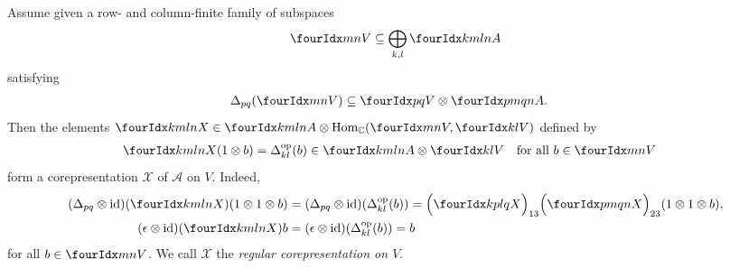 \begin{Exa} \label{example:corep-regular}
  Assume  given a row- and column-finite family of subspaces
  \begin{align*}
    \Gru{V}{m}{n} \subseteq \bigoplus_{k,l} \Gr{A}{k}{l}{m}{n}
  \end{align*}
  satisfying
  \begin{align} \label{eq:corep-regular-inclusion}
    \Delta_{pq}(\Gru{V}{m}{n}) &\subseteq \Gru{V}{p}{q} \otimes
    \Gr{A}{p}{q}{m}{n}.
  \end{align}
Then the  elements $\Gr{X}{k}{l}{m}{n} \in \Gr{A}{k}{l}{m}{n} \otimes
  \Hom_{\C}(\Gru{V}{m}{n},\Gru{V}{k}{l})$ defined by 
  \begin{align*}
    \Gr{X}{k}{l}{m}{n}(1 \otimes b) &= \Delta^{\op}_{kl}(b) \in
    \Gr{A}{k}{l}{m}{n} \otimes \Gru{V}{k}{l} \quad
    \text{for all } b\in \Gru{V}{m}{n}
  \end{align*}
  form a corepresentation $\mathscr{X}$ of $\mathscr{A}$ on
  $V$. Indeed, 
  \begin{align*}
    (\Delta_{pq} \otimes \id)(\Gr{X}{k}{l}{m}{n})(1 \otimes 1 \otimes
    b) &=(\Delta_{pq}\otimes \id)(\Delta^{\op}_{kl}(b)) =
    \Big{(}\Gr{X}{k}{l}{p}{q}\Big{)}_{13}\Big{(}\Gr{X}{p}{q}{m}{n}\Big{)}_{23}(1
    \otimes 1 \otimes b), \\
    (\epsilon \otimes \id)(\Gr{X}{k}{l}{m}{n})b &= (\epsilon \otimes
    \id)(\Delta^{\op}_{kl}(b)) = b
  \end{align*}
  for all $b\in \Gru{V}{m}{n}$.  We call $\mathscr{X}$ the
  \emph{regular corepresentation on $V$}.
\end{Exa}


